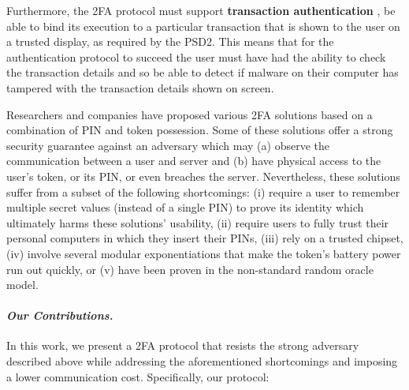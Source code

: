 Furthermore, the 2FA protocol must support \textbf{transaction authentication} \ie, be able to bind its execution to a particular transaction that is shown to the user on a trusted display, as required by the PSD2.
This means that for the authentication protocol to succeed the user must have had the ability to check the transaction details and so be able to detect if malware on their computer has tampered with the transaction details shown on screen.



Researchers and companies have proposed various 2FA solutions based on a combination of PIN and token possession. Some of these solutions offer a strong security guarantee against an adversary which may (a) observe the communication between a user and server and (b) have physical access to the user's token, or its PIN, or even breaches the server. Nevertheless, these solutions suffer from a subset of the following shortcomings: (i) require a user to remember multiple secret values (instead of a single PIN)  to prove its identity which ultimately harms these solutions' usability, (ii) require users to fully trust their personal computers in which they insert their PINs, (iii) rely on a trusted chipset, (iv) involve several modular exponentiations that make the token's battery power run out quickly, or (v) have been proven in the non-standard random oracle model.







\paragraph{\textbf{\textit{Our Contributions.}}}  In this work, we present a 2FA protocol that resists the strong adversary described above while addressing the aforementioned shortcomings and imposing a lower communication cost. Specifically, our protocol:

